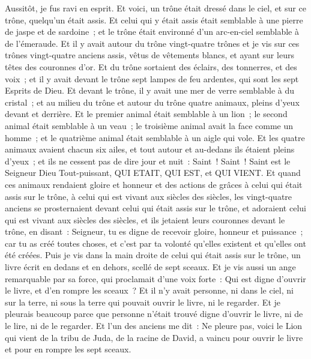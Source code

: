 \begin{multicols}{2}
Aussitôt, je fus ravi en esprit. Et voici, un trône était dressé dans le ciel, et sur ce trône, quelqu'un était assis.
Et celui qui y était assis était semblable à une pierre de jaspe et de sardoine~; et le trône était environné d'un arc-en-ciel semblable à de l'émeraude.
Et il y avait autour du trône vingt-quatre trônes et je vis sur ces trônes vingt-quatre anciens assis, vêtus de vêtements blancs, et ayant sur leurs têtes des couronnes d'or.
Et du trône sortaient des éclairs, des tonnerres, et des voix~; et il y avait devant le trône sept lampes de feu ardentes, qui sont les sept Esprits de Dieu.
Et devant le trône, il y avait une mer de verre semblable à du cristal~; et au milieu du trône et autour du trône quatre animaux, pleins d'yeux devant et derrière.
Et le premier animal était semblable à un lion~; le second animal était semblable à un veau~; le troisième animal avait la face comme un homme~; et le quatrième animal était semblable à un aigle qui vole.
Et les quatre animaux avaient chacun six ailes, et tout autour et au-dedans ils étaient pleins d'yeux~; et ils ne cessent pas de dire jour et nuit~: Saint~! Saint~! Saint est le Seigneur Dieu Tout-puissant, QUI ETAIT, QUI EST, et QUI VIENT.
Et quand ces animaux rendaient gloire et honneur et des actions de grâces à celui qui était assis sur le trône, à celui qui est vivant aux siècles des siècles,
les vingt-quatre anciens se prosternaient devant celui qui était assis sur le trône, et adoraient celui qui est vivant aux siècles des siècles, et ils jetaient leurs couronnes devant le trône, en disant~:
Seigneur, tu es digne de recevoir gloire, honneur et puissance~; car tu as créé toutes choses, et c'est par ta volonté qu'elles existent et qu'elles ont été créées.
\VerseOne{}Puis je vis dans la main droite de celui qui était assis sur le trône, un livre écrit en dedans et en dehors, scellé de sept sceaux.
Et je vis aussi un ange remarquable par sa force, qui proclamait d'une voix forte~: Qui est digne d'ouvrir le livre, et d'en rompre les sceaux~?
Et il n'y avait personne, ni dans le ciel, ni sur la terre, ni sous la terre qui pouvait ouvrir le livre, ni le regarder.
Et je pleurais beaucoup parce que personne n'était trouvé digne d'ouvrir le livre, ni de le lire, ni de le regarder.
Et l'un des anciens me dit~: Ne pleure pas, voici le Lion qui vient de la tribu de Juda, de la racine de David, a vaincu pour ouvrir le livre et pour en rompre les sept sceaux.

\end{multicols}
